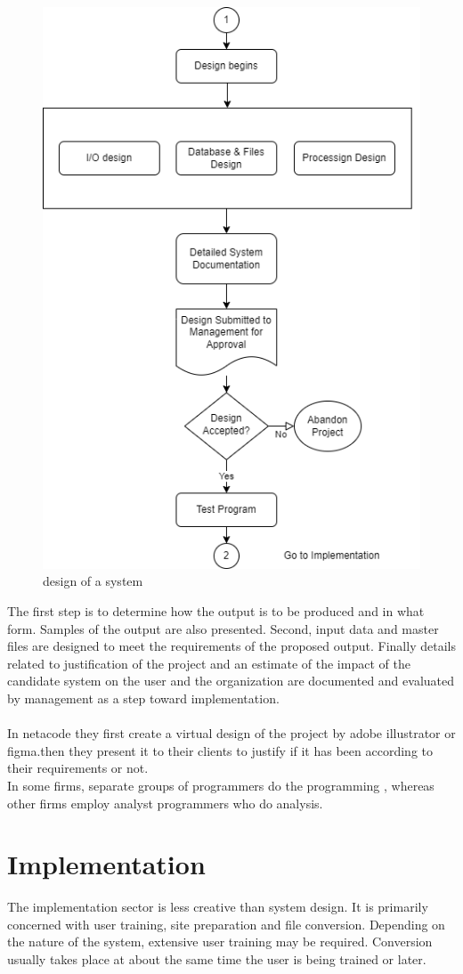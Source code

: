 \documentclass[a4paper,12pt]{report}
\begin{document}
\begin{figure}[h]
	\centering
	\includegraphics[width=0.7\linewidth]{2_2.png}
	\caption{design of a system}
	\label{fig:2_2}
\end{figure}
The first step is to determine how the output is to be produced and in what form. Samples of the output are also presented. Second, input data and master files  are designed to meet the requirements of the proposed output. Finally details related to justification of the project and an estimate of the impact of the candidate system on the user and the organization  are documented and evaluated by management as a step toward implementation.
\\ \\
In netacode they first create a virtual design of the project by adobe illustrator or figma.then they present it to their clients to justify if it has been according to their requirements or not.\\
In some firms, separate groups of programmers do the programming , whereas other firms employ analyst programmers who do analysis.
\section{Implementation}
The implementation sector is less creative than system design. It is primarily concerned with user training, site preparation and file conversion. Depending on the nature of the system, extensive user training may be required. Conversion usually takes place at about the same time the user is being trained or later.\\
\end{document}
